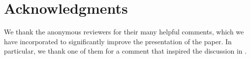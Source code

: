 \documentclass[letterpaper]{article} %
\begin{document}



\section*{Acknowledgments}
We thank the anonymous reviewers for their many helpful comments, which we have incorporated to 
significantly improve the presentation of the paper.
In particular, we thank one of them for a comment that inspired the discussion in
.

% 



\clearpage
\appendix
\end{document}
